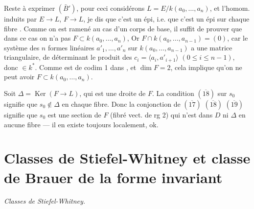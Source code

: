 \documentclass[11pt,a4paper]{article}
\begin{document}
Reste à exprimer $(\bar B')$, pour ceci considérons   $L = E / k(a_0, \dots, a_n)$, et l'homom.  induits par $E \to L$, $F \to L$,  je dis que c'est un épi, i.e. que c'est un épi sur chaque fibre . Comme on est ramené au cas d'un corps de base, il suffit de prouver que dans ce cas  on n'a pas $F \subset k(a_0, \dots, a_n)$,   Or $F \cap k(a_0, \dots, a_{n-1}) = (0)$, car le système des $n$ formes linéaires $a'_1, \dots, a'_n$ sur $k(a_0, \dots, a_{n-1})$ a une matrice triangulaire, de déterminant le produit des $c_i = \langle a_i, a'_{i+1}\rangle$ $(0 \leq i \leq n-1)$, donc $\in k^*$. Comme  est de codim 1 dans , \struck{\ill{}} et $\dim F = 2$, cela implique qu'on ne peut avoir $F \subset k(a_0, \dots, a_n)$.

Soit  $\Delta = \operatorname{Ker}(F \to L)$, qui est une droite de $F$. La condition $(\overline{18})$ sur $s_0$ signifie que $s_0 \notin \Delta$ en chaque fibre. Donc la conjonction de $(\overline{17})$ $(\overline{18})$ $(\overline{19})$ signifie que $s_0$ est une section de $F$ (fibré vect. de rg 2) qui n'est dans $D$ ni $\Delta$ en aucune fibre — il en existe toujours localement, ok.

\section*{Classes de Stiefel-Whitney et classe de Brauer de la forme invariant}



\emph{Classes de Stiefel-Whitney.}
\end{document}
